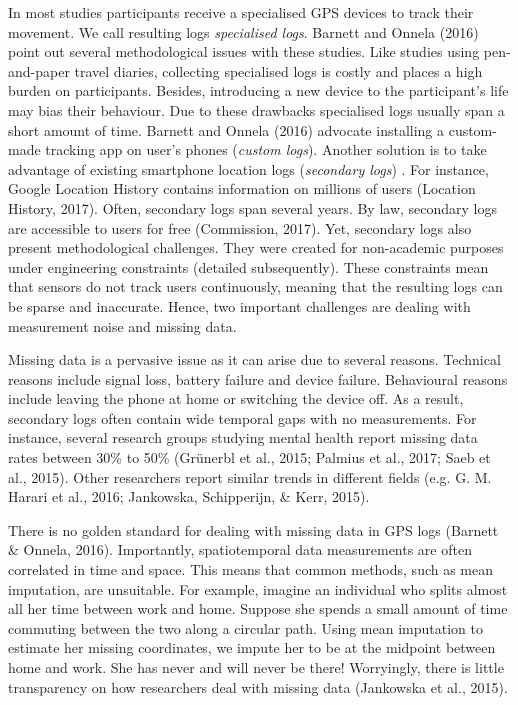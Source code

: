 \documentclass[english,man]{apa6}
\theoremstyle{definition}
\theoremstyle{definition}
\theoremstyle{definition}
\theoremstyle{remark}
\begin{document}
In most studies participants receive a specialised GPS devices to track
their movement. We call resulting logs \emph{specialised logs}. Barnett
and Onnela (2016) point out several methodological issues with these
studies. Like studies using pen-and-paper travel diaries, collecting
specialised logs is costly and places a high burden on participants.
Besides, introducing a new device to the participant's life may bias
their behaviour. Due to these drawbacks specialised logs usually span a
short amount of time. Barnett and Onnela (2016) advocate installing a
custom-made tracking app on user's phones (\emph{custom logs}). Another
solution is to take advantage of existing smartphone location logs
(\emph{secondary logs}) . For instance, Google Location History contains
information on millions of users (Location History, 2017). Often,
secondary logs span several years. By law, secondary logs are accessible
to users for free (Commission, 2017). Yet, secondary logs also present
methodological challenges. They were created for non-academic purposes
under engineering constraints (detailed subsequently). These constraints
mean that sensors do not track users continuously, meaning that the
resulting logs can be sparse and inaccurate. Hence, two important
challenges are dealing with measurement noise and missing data.

Missing data is a pervasive issue as it can arise due to several
reasons. Technical reasons include signal loss, battery failure and
device failure. Behavioural reasons include leaving the phone at home or
switching the device off. As a result, secondary logs often contain wide
temporal gaps with no measurements. For instance, several research
groups studying mental health report missing data rates between 30\% to
50\% (Grünerbl et al., 2015; Palmius et al., 2017; Saeb et al., 2015).
Other researchers report similar trends in different fields (e.g. G. M.
Harari et al., 2016; Jankowska, Schipperijn, \& Kerr, 2015).

There is no golden standard for dealing with missing data in GPS logs
(Barnett \& Onnela, 2016). Importantly, spatiotemporal data measurements
are often correlated in time and space. This means that common methods,
such as mean imputation, are unsuitable. For example, imagine an
individual who splits almost all her time between work and home. Suppose
she spends a small amount of time commuting between the two along a
circular path. Using mean imputation to estimate her missing
coordinates, we impute her to be at the midpoint between home and work.
She has never and will never be there! Worryingly, there is little
transparency on how researchers deal with missing data (Jankowska et
al., 2015).
\end{document}
